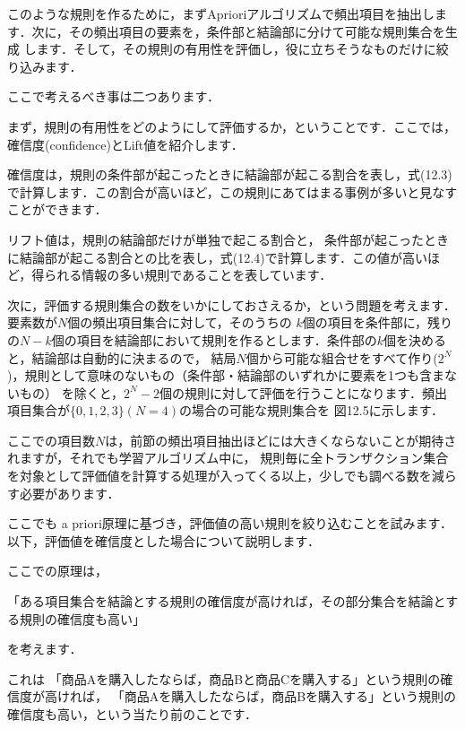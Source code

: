 
このような規則を作るために，まずAprioriアルゴリズムで頻出項目を抽出します．次に，その頻出項目の要素を，条件部と結論部に分けて可能な規則集合を生成
します．そして，その規則の有用性を評価し，役に立ちそうなものだけに絞り込みます．


ここで考えるべき事は二つあります．


まず，規則の有用性をどのようにして評価するか，ということです．ここでは，確信度(confidence)とLift値を紹介します．

確信度は，規則の条件部が起こったときに結論部が起こる割合を表し，式(12.3)で計算します．この割合が高いほど，この規則にあてはまる事例が多いと見なすことができます．


リフト値は，規則の結論部だけが単独で起こる割合と，
条件部が起こったときに結論部が起こる割合との比を表し，式(12.4)で計算します．この値が高いほど，得られる情報の多い規則であることを表しています．



次に，評価する規則集合の数をいかにしておさえるか，という問題を考えます．要素数が$N$個の頻出項目集合に対して，そのうちの
$k$個の項目を条件部に，残りの$N-k$個の項目を結論部において規則を作るとします．条件部の$k$個を決めると，結論部は自動的に決まるので，
結局$N$個から可能な組合せをすべて作り($2^N$)，規則として意味のないもの（条件部・結論部のいずれかに要素を1つも含まないもの）
を除くと，$2^N-2$個の規則に対して評価を行うことになります．頻出項目集合が$\{0,1,2,3\} (N=4)$の場合の可能な規則集合を
図12.5に示します．


ここでの項目数$N$は，前節の頻出項目抽出ほどには大きくならないことが期待されますが，それでも学習アルゴリズム中に，
規則毎に全トランザクション集合を対象として評価値を計算する処理が入ってくる以上，少しでも調べる数を減らす必要があります．


ここでも a priori原理に基づき，評価値の高い規則を絞り込むことを試みます．以下，評価値を確信度とした場合について説明します．

ここでの原理は，

「ある項目集合を結論とする規則の確信度が高ければ，その部分集合を結論とする規則の確信度も高い」

を考えます．

これは
「商品Aを購入したならば，商品Bと商品Cを購入する」という規則の確信度が高ければ，
「商品Aを購入したならば，商品Bを購入する」という規則の確信度も高い，という当たり前のことです．

